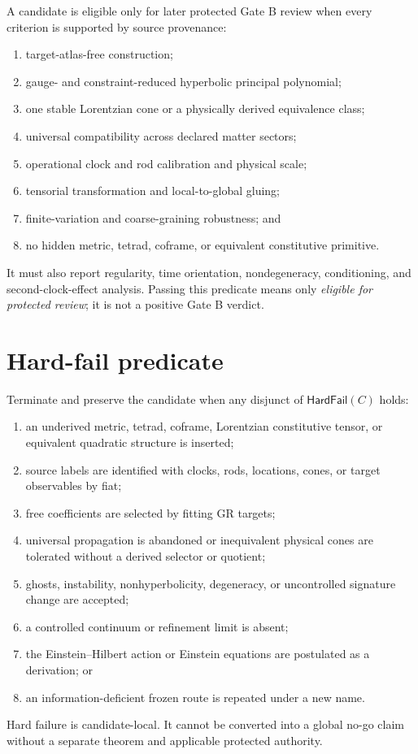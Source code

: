 \documentclass[11pt]{article}
\newcommand{\Fail}{\mathsf{HardFail}}
\begin{document}
A candidate is eligible only for later protected Gate B review when every
criterion is supported by source provenance:
\begin{enumerate}
  \item target-atlas-free construction;
  \item gauge- and constraint-reduced hyperbolic principal polynomial;
  \item one stable Lorentzian cone or a physically derived equivalence class;
  \item universal compatibility across declared matter sectors;
  \item operational clock and rod calibration and physical scale;
  \item tensorial transformation and local-to-global gluing;
  \item finite-variation and coarse-graining robustness; and
  \item no hidden metric, tetrad, coframe, or equivalent constitutive primitive.
\end{enumerate}
It must also report regularity, time orientation, nondegeneracy, conditioning,
and second-clock-effect analysis. Passing this predicate means only
\emph{eligible for protected review}; it is not a positive Gate B verdict.

\section{Hard-fail predicate}

Terminate and preserve the candidate when any disjunct of $\Fail(C)$ holds:
\begin{enumerate}
  \item an underived metric, tetrad, coframe, Lorentzian constitutive tensor,
  or equivalent quadratic structure is inserted;
  \item source labels are identified with clocks, rods, locations, cones, or
  target observables by fiat;
  \item free coefficients are selected by fitting GR targets;
  \item universal propagation is abandoned or inequivalent physical cones are
  tolerated without a derived selector or quotient;
  \item ghosts, instability, nonhyperbolicity, degeneracy, or uncontrolled
  signature change are accepted;
  \item a controlled continuum or refinement limit is absent;
  \item the Einstein--Hilbert action or Einstein equations are postulated as a
  derivation; or
  \item an information-deficient frozen route is repeated under a new name.
\end{enumerate}
Hard failure is candidate-local. It cannot be converted into a global no-go
claim without a separate theorem and applicable protected authority.
\end{document}
